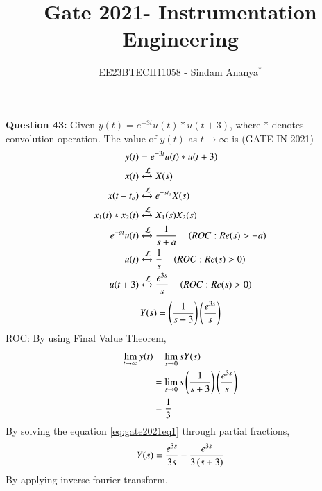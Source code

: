 \documentclass[journal,12pt,twocolumn]{IEEEtran}
\theoremstyle{remark}
\begin{document}

\vspace{3cm}

\title{Gate 2021- Instrumentation Engineering}
\author{EE23BTECH11058 - Sindam Ananya$^{*}$%
}
\maketitle
\newpage
\bigskip

\renewcommand{\thefigure}{\theenumi}
\renewcommand{\thetable}{\theenumi}

\vspace{3cm}
\textbf{Question 43:} 
Given $y(t) = e^{-3t}u(t) * u(t+3)$, where * denotes convolution operation. The value of $y(t)$ as $t \rightarrow \infty$ is
\hfill{(GATE IN 2021)}\\
\solution
\begin{align}
y(t) &=  e^{-3t}u(t) * u(t+3)\\
x(t) &\xleftrightarrow{\mathcal{L}} X(s)\\
x(t-t_o) &\xleftrightarrow{\mathcal{L}} e^{-s t_o}X(s)\\
x_1(t) * x_2(t) &\xleftrightarrow{\mathcal{L}} X_1(s)X_2(s)\\
e^{-at}u(t) &\xleftrightarrow{\mathcal{L}} \frac{1}{s + a} \quad \left(ROC:Re(s)>-a\right)\\
u(t) &\xleftrightarrow{\mathcal{L}} \frac{1}{s} \quad \left(ROC:Re(s)>0\right)\\
u(t+3) &\xleftrightarrow{\mathcal{L}} \frac{e^{3s}}{s} \quad \left(ROC:Re(s)>0\right)\\
\end{align}
\begin{equation} 
Y(s) = \left(\frac{1}{s + 3}\right)\left(\frac{e^{3s}}{s}\right)
\label{eq:gate2021eq1}
\end{equation}
ROC: 
By using Final Value Theorem,
\begin{align}
\lim\limits_{t \to \infty} y(t) &= \lim\limits_{s \to 0} sY(s)\\
                                &= \lim\limits_{s \to 0} s\left(\frac{1}{s + 3}\right)\left(\frac{e^{3s}}{s}\right)\\
                                &= \frac{1}{3}
\end{align}
By solving the equation \eqref{eq:gate2021eq1} through partial fractions,
\begin{align}
Y(s) = \frac{e^{3s}}{3s} - \frac{e^{3s}}{3\left(s+3\right)} 
\end{align}
By applying inverse fourier transform,
\end{document}
